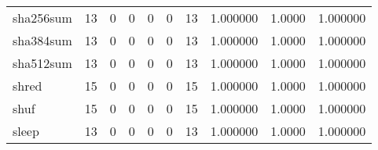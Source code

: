 \begin{tabular}{lrrrrrrrrr}
sha256sum &                                       13 &                                                  0 &                                                  0 &                                                  0 &                                                  0 &                                                 13 &                                           1.000000 &                                 1.0000 &                             1.000000 \\
sha384sum &                                       13 &                                                  0 &                                                  0 &                                                  0 &                                                  0 &                                                 13 &                                           1.000000 &                                 1.0000 &                             1.000000 \\
sha512sum &                                       13 &                                                  0 &                                                  0 &                                                  0 &                                                  0 &                                                 13 &                                           1.000000 &                                 1.0000 &                             1.000000 \\
shred     &                                       15 &                                                  0 &                                                  0 &                                                  0 &                                                  0 &                                                 15 &                                           1.000000 &                                 1.0000 &                             1.000000 \\
shuf      &                                       15 &                                                  0 &                                                  0 &                                                  0 &                                                  0 &                                                 15 &                                           1.000000 &                                 1.0000 &                             1.000000 \\
sleep     &                                       13 &                                                  0 &                                                  0 &                                                  0 &                                                  0 &                                                 13 &                                           1.000000 &                                 1.0000 &                             1.000000 \\

\end{tabular}
